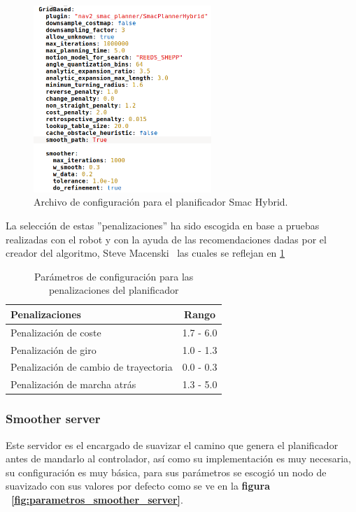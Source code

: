 \begin{figure}[H]
    \centering
    \includegraphics[width=0.6\textwidth]{images/smacplanner_configuracion.png}
    \caption{Archivo de configuración para el planificador Smac Hybrid.}
    \label{fig:configuracion_planner}
\end{figure}

La selección de estas ''penalizaciones'' ha sido escogida en base a pruebas realizadas con el robot y con la ayuda de las recomendaciones dadas 
por el creador del algoritmo, Steve Macenski~\cite{steve_mc} las cuales se reflejan en \ref{tab:parametros_planificador_steve}

\begin{table}[h!]
    \centering
    \caption{Parámetros de configuración para las penalizaciones del planificador}
    \begin{tabular}{|l|c|}
        \hline
        Penalizaciones     & Rango      \\ \hline
        Penalización de coste          & 1.7 - 6.0  \\ \hline
        Penalización de giro  & 1.0 - 1.3  \\ \hline
        Penalización de cambio de trayectoria        & 0.0 - 0.3  \\ \hline
        Penalización de marcha atrás       & 1.3 - 5.0  \\ \hline
    \end{tabular}
    \label{tab:parametros_planificador_steve}
\end{table}




\subsubsection{Smoother server}
Este servidor es el encargado de suavizar el camino que genera el planificador antes de mandarlo al controlador, así como su implementación es muy necesaria,  
su configuración es muy básica, para sus parámetros se escogió un nodo de suavizado con sus valores por defecto como se ve en la \textbf{figura ~\ref{fig:parametros_smoother_server}}.

